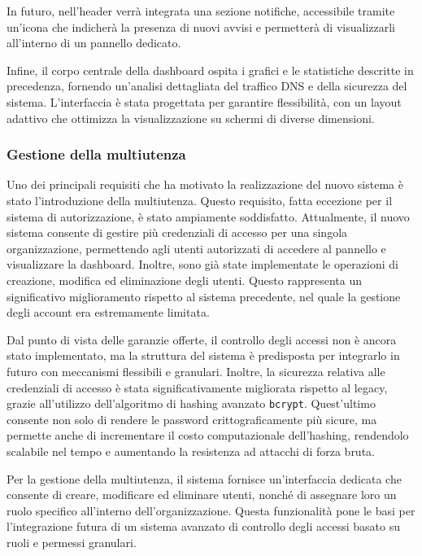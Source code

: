 In futuro, nell’header verrà integrata una sezione notifiche, accessibile tramite un’icona che indicherà la presenza di nuovi avvisi e permetterà di visualizzarli all’interno di un pannello dedicato.

Infine, il corpo centrale della dashboard ospita i grafici e le statistiche descritte in precedenza, fornendo un’analisi dettagliata del traffico DNS e della sicurezza del sistema. L’interfaccia è stata progettata per garantire flessibilità, con un layout adattivo che ottimizza la visualizzazione su schermi di diverse dimensioni.

\subsubsection{Gestione della multiutenza}
Uno dei principali requisiti che ha motivato la realizzazione del nuovo sistema è stato l’introduzione della multiutenza. Questo requisito, fatta eccezione per il sistema di autorizzazione, è stato ampiamente soddisfatto. Attualmente, il nuovo sistema consente di gestire più credenziali di accesso per una singola organizzazione, permettendo agli utenti autorizzati di accedere al pannello e visualizzare la dashboard. Inoltre, sono già state implementate le operazioni di creazione, modifica ed eliminazione degli utenti. Questo rappresenta un significativo miglioramento rispetto al sistema precedente, nel quale la gestione degli account era estremamente limitata.

Dal punto di vista delle garanzie offerte, il controllo degli accessi non è ancora stato implementato, ma la struttura del sistema è predisposta per integrarlo in futuro con meccanismi flessibili e granulari. Inoltre, la sicurezza relativa alle credenziali di accesso è stata significativamente migliorata rispetto al legacy, grazie all’utilizzo dell'algoritmo di hashing avanzato \texttt{bcrypt}. Quest’ultimo consente non solo di rendere le password crittograficamente più sicure, ma permette anche di incrementare il costo computazionale dell’hashing, rendendolo scalabile nel tempo e aumentando la resistenza ad attacchi di forza bruta.

Per la gestione della multiutenza, il sistema fornisce un’interfaccia dedicata che consente di creare, modificare ed eliminare utenti, nonché di assegnare loro un ruolo specifico all’interno dell’organizzazione. Questa funzionalità pone le basi per l’integrazione futura di un sistema avanzato di controllo degli accessi basato su ruoli e permessi granulari.


